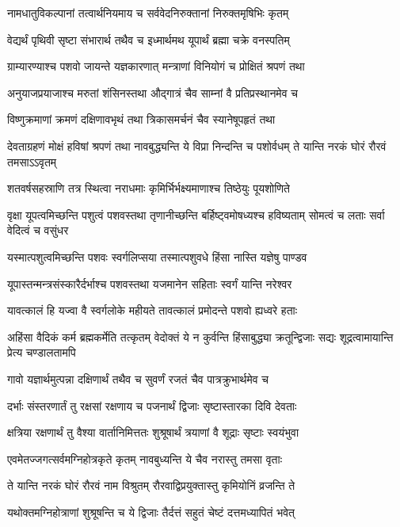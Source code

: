 \twolineshloka
{नामधातुविकल्पानां तत्वार्थनियमाय च}
{सर्ववेदनिरुक्तानां निरुक्तमृषिभिः कृतम्}


\twolineshloka
{वेद्यर्थं पृथिवी सृष्टा संभारार्थ तथैव च}
{इध्मार्थमथ यूपार्थं ब्रह्मा चक्रे वनस्पतिम्}


\twolineshloka
{ग्राम्यारण्याश्च पशवो जायन्ते यज्ञकारणात्}
{मन्त्राणां विनियोगं च प्रोक्षितं श्रपणं तथा}


\twolineshloka
{अनुयाजप्रयाजाश्च मरुतां शंसिनस्तथा}
{औद्गात्रं चैव साम्नां वै प्रतिप्रस्थानमेव च}


\twolineshloka
{विष्णुक्रमाणां क्रमणं दक्षिणावभृथं तथा}
{त्रिकासमर्चनं चैव स्यानेषूपहृतं तथा}


\threelineshloka
{देवताग्रहणं मोक्षं हविषां श्रपणं तथा}
{नावबुद्ध्यन्ति ये विप्रा निन्दन्ति च पशोर्वधम्}
{ते यान्ति नरकं घोरं रौरवं तमसाऽऽवृतम्}


\twolineshloka
{शतवर्षसहस्राणि तत्र स्थित्वा नराधमाः}
{कृमिर्भिर्भक्ष्यमाणाश्च तिष्ठेयुः पूयशोणिते}


\threelineshloka
{वृक्षा यूपत्वमिच्छन्ति पशुत्वं पशवस्तथा}
{तृणानीच्छन्ति बर्हिष्ट्वमोषध्यश्च हविष्यताम्}
{सोमत्वं च लताः सर्वा वेदित्वं च वसुंधर}


\twolineshloka
{यस्मात्पशुत्वमिच्छन्ति पशवः स्वर्गलिप्सया}
{तस्मात्पशुवधे हिंसा नास्ति यज्ञेषु पाण्डव}


\twolineshloka
{यूपास्तन्मन्त्रसंस्कारैर्दर्भाश्च पशवस्तथा}
{यजमानेन सहिताः स्वर्गं यान्ति नरेश्वर}


\twolineshloka
{यावत्कालं हि यज्वा वै स्वर्गलोके महीयते}
{तावत्कालं प्रमोदन्ते पशवो ह्यध्वरे हताः}


\threelineshloka
{अहिंसा वैदिकं कर्म ब्रह्मकर्मेति तत्कृतम्}
{वेदोक्तं ये न कुर्वन्ति हिंसाबुद्ध्या क्रतून्द्विजाः}
{सद्यः शूद्रत्वामायान्ति प्रेत्य चण्डालतामपि}


\twolineshloka
{गावो यज्ञार्थमुत्पन्ना दक्षिणार्थं तथैव च}
{सुवर्णं रजतं चैव पात्रक्रुभार्थमेव च}


\twolineshloka
{दर्भाः संस्तरणार्तं तु रक्षसां रक्षणाय च}
{पजनार्थं द्विजाः सृष्टास्तारका दिवि देवताः}


\twolineshloka
{क्षत्रिया रक्षणार्थं तु वैश्या वार्तानिमित्ततः}
{शुश्रूषार्थं त्रयाणां वै शूद्राः सृष्टाः स्वयंभुवा}


\twolineshloka
{एवमेतज्जगत्सर्वमग्निहोत्रकृते कृतम्}
{नावबुध्यन्ति ये चैव नरास्तु तमसा वृताः}


\twolineshloka
{ते यान्ति नरकं घोरं रौरवं नाम विश्रुतम्}
{रौरवाद्विप्रयुक्तास्तु कृमियोनिं व्रजन्ति ते}


\twolineshloka
{यथोक्तमग्निहोत्राणां शुश्रूषन्ति च ये द्विजाः}
{तैर्दत्तं सहुतं चेष्टं दत्तमध्यापितं भवेत्}


